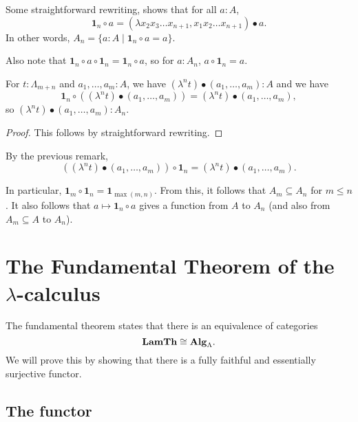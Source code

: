 \begin{remark}
  Some straightforward rewriting, shows that for all $ a : A $,
  \[ \mathbf 1_n \circ a = (\lambda x_2 x_3 \dots x_{n + 1}, x_1 x_2 \dots x_{n + 1}) \bullet a. \]
  In other words, $ A_n = \{ a : A \mid \mathbf 1_n \circ a = a \} $.
\end{remark}

\begin{remark}
  Also note that $ \mathbf 1_n \circ a \circ \mathbf 1_n = \mathbf 1_n \circ a $, so for $ a : A_n $, $ a \circ \mathbf 1_n = a $.
\end{remark}

\begin{lemma}
  For $ t: \Lambda_{m + n} $ and $ a_1, \dots, a_m: A $, we have $ (\lambda^n t) \bullet (a_1, \dots, a_m) : A $ and we have
  \[ \mathbf 1_n \circ ((\lambda^n t) \bullet (a_1, \dots, a_m)) = (\lambda^n t) \bullet (a_1, \dots, a_m), \]
  so $ (\lambda^n t) \bullet (a_1, \dots, a_m) : A_n $.
\end{lemma}
\begin{proof}
  This follows by straightforward rewriting.
\end{proof}

\begin{corollary}
  By the previous remark,
  \[ ((\lambda^n t) \bullet (a_1, \dots, a_m)) \circ \mathbf 1_n = (\lambda^n t) \bullet (a_1, \dots, a_m). \]
\end{corollary}
\begin{corollary}
  In particular, $ \mathbf 1_m \circ \mathbf 1_n = \mathbf 1_{\max(m, n)} $. From this, it follows that $ A_m \subseteq A_n $ for $ m \leq n $. It also follows that $ a \mapsto \mathbf 1_n \circ a $ gives a function from $ A $ to $ A_n $ (and also from $ A_m \subseteq A $ to $ A_n $).
\end{corollary}


\section{The Fundamental Theorem of the \texorpdfstring{$ \lambda $-}{lambda }calculus}

The fundamental theorem states that there is an equivalence of categories
\[ \mathbf{LamTh} \cong \mathbf{Alg}_{\Lambda}. \]
We will prove this by showing that there is a fully faithful and essentially surjective functor.


\subsection{The functor}


